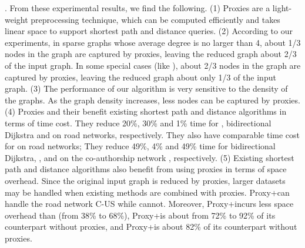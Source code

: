\vspace{-0.5ex}
.
From these experimental results, we find the following. (1) Proxies are a light-weight preprocessing technique, which can be computed efficiently and takes linear space to support shortest path and distance queries.  (2) According to our experiments, in sparse graphs whose average degree is no larger than 4, about 1/3 nodes in the graph are captured by proxies, leaving the reduced graph about 2/3 of the input graph. In some special cases (like \dblpone), about 2/3 nodes in the graph are captured by proxies, leaving the reduced graph about only 1/3 of the input graph. (3) The performance of our algorithm is very sensitive to the density of the graphs. As the graph density increases, less nodes can be captured by proxies. (4) Proxies and their \dras benefit existing shortest path and distance algorithms in terms of time cost. They reduce 20\%, 30\% and 1\% time for \arcflag, bidirectional Dijkstra and \ah on road networks, respectively. They also have comparable time cost for \tnr on road networks; They reduce 49\%, 4\% and 49\% time for bidirectional Dijkstra, \arcflag, and \tnr on the co-authorship network \dblpone, respectively. (5) Existing shortest path and distance algorithms also benefit from using proxies in terms of space overhead. Since the original input graph is reduced by proxies, larger datasets may be handled when existing methods are combined with proxies.  Proxy+\tnr can handle the road network C-US while \tnr cannot. Moreover, Proxy+\arcflag incurs less space overhead than \arcflag (from 38\% to 68\%), Proxy+\tnr is about from 72\% to 92\% of its counterpart without proxies, and Proxy+\ah is about 82\% of its counterpart without proxies.

